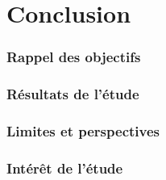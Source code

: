 \chapter*{Conclusion}
\label{chap:conclusion}

\subsection*{Rappel des objectifs}

\subsection*{Résultats de l'étude}

\subsection*{Limites et perspectives}


\subsection*{Intérêt de l'étude}
